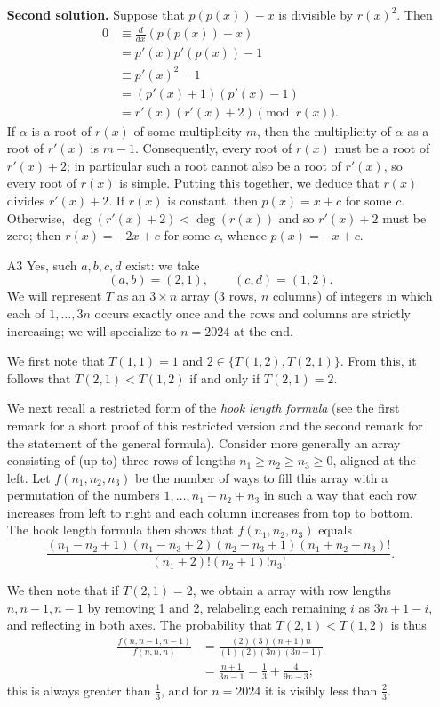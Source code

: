 \documentclass[amssymb,twocolumn,pra,10pt,aps]{revtex4-1}
\begin{document}
\begin{itemize}
\noindent
\textbf{Second solution.}
Suppose that $p(p(x))-x$ is divisible by $r(x)^2$. Then
\begin{align*}
0 &\equiv \frac{d}{dx}(p(p(x)) - x) \\
&= p'(x) p'(p(x)) - 1 \\
&\equiv p'(x)^2 -1 \\
&= (p'(x) + 1)(p'(x) - 1) \\
&= r'(x) (r'(x) + 2) 
\pmod{r(x)}.
\end{align*}
If $\alpha$ is a root of $r(x)$ of some multiplicity $m$, then the multiplicity of $\alpha$ as a root of $r'(x)$ is $m-1$. Consequently, every root of $r(x)$ must be a root of $r'(x)+ 2$;
in particular such a root cannot also be a root of $r'(x)$, so every root of $r(x)$ is simple.
Putting this together, we deduce that $r(x)$ divides $r'(x) + 2$. If $r(x)$ is constant,
then $p(x) = x+c$ for some $c$. Otherwise, $\deg(r'(x) + 2) < \deg(r(x))$ and so $r'(x) + 2$ must be zero; then $r(x) = -2x + c$ for some $c$, whence $p(x) = -x + c$.

\item[A3]
Yes, such $a,b,c,d$ exist: we take
\[
(a,b) = (2,1), \qquad (c,d) = (1,2).
\]
We will represent $T$ as an $3 \times n$ array (3 rows, $n$ columns) of integers  in which each of $1,\dots,3n$ occurs exactly once and the rows and columns are strictly increasing; we will specialize to $n=2024$ at the end.

We first note that $T(1,1) = 1$ and $2 \in \{T(1,2), T(2,1)\}$.
From this, it follows that $T(2,1) < T(1,2)$ if and only if $T(2,1) = 2$.

We next recall a restricted form of the \emph{hook length formula}
(see the first remark for a short proof of this restricted version and the second remark for the statement of the general formula).
Consider more generally an array consisting of (up to) three rows of lengths $n_1\geq n_2 \geq n_3 \geq 0$, aligned at the left.
Let $f(n_1,n_2,n_3)$ be the number of ways to fill this array with a permutation of the numbers $1,\dots,n_1+n_2+n_3$ in such a way that each row increases from left to right and each column increases from top to bottom. The hook length formula then shows that $f(n_1,n_2,n_3)$ equals
\[
\frac{(n_1-n_2+1)(n_1-n_3+2)(n_2-n_3+1) (n_1+n_2+n_3)!}
{(n_1+2)! (n_2+1)! n_3!}.
\]

We then note that if $T(2,1) = 2$, we obtain a array with row lengths $n, n-1, n-1$ by removing 1 and 2, relabeling each remaining $i$ as $3n+1-i$, and reflecting in both axes. The probability that $T(2,1) < T(1,2)$ is thus
\begin{align*}
\frac{f(n,n-1,n-1)}{f(n,n,n)}
&= 
\frac{(2)(3)(n+1)n}{(1)(2) (3n)(3n-1)} \\
&= \frac{n+1}{3n-1} = \frac{1}{3} + \frac{4}{9n-3};
\end{align*}
this is always greater than $\frac{1}{3}$, and for $n =2024$ it is visibly less than $\frac{2}{3}$.


\end{itemize}
\end{document}
